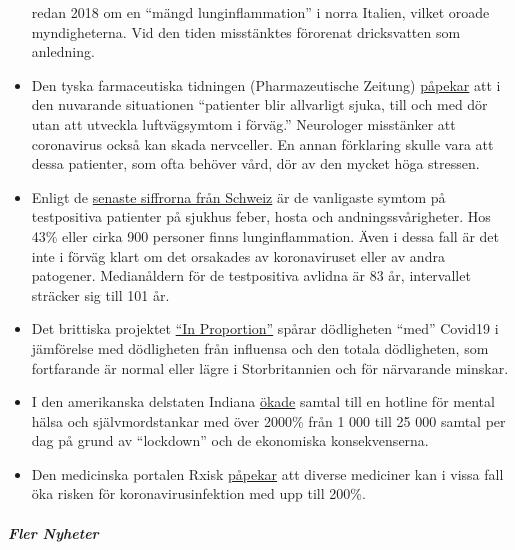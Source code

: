 \begin{itemize}
  redan 2018 om en ``mängd lunginflammation'' i norra Italien, vilket
  oroade myndigheterna. Vid den tiden misstänktes förorenat dricksvatten
  som anledning.
\item
  Den tyska farmaceutiska tidningen (Pharmazeutische Zeitung)
  \href{https://www.pharmazeutische-zeitung.de/atemstillstand-koennte-auch-zentrale-ursache-haben-116664/}{påpekar}
  att i den nuvarande situationen ``patienter blir allvarligt sjuka,
  till och med dör utan att utveckla luftvägsymtom i förväg.''
  Neurologer misstänker att coronavirus också kan skada nervceller. En
  annan förklaring skulle vara att dessa patienter, som ofta behöver
  vård, dör av den mycket höga stressen.
\item
  Enligt de
  \href{https://www.bag.admin.ch/dam/bag/de/dokumente/mt/k-und-i/aktuelle-ausbrueche-pandemien/2019-nCoV/covid-19-lagebericht.pdf.download.pdf/COVID-19_Epidemiologische_Lage_Schweiz.pdf}{senaste
  siffrorna från Schweiz} är de vanligaste symtom på testpositiva
  patienter på sjukhus feber, hosta och andningssvårigheter. Hos 43\%
  eller cirka 900 personer finns lunginflammation. Även i dessa fall är
  det inte i förväg klart om det orsakades av koronaviruset eller av
  andra patogener. Medianåldern för de testpositiva avlidna är 83 år,
  intervallet sträcker sig till 101 år.
\item
  Det brittiska projektet \href{http://inproportion2.talkigy.com/}{``In
  Proportion''} spårar dödligheten ``med'' Covid19 i jämförelse med
  dödligheten från influensa och den totala dödligheten, som fortfarande
  är normal eller lägre i Storbritannien och för närvarande minskar.
\item
  I den amerikanska delstaten Indiana
  \href{https://twitter.com/JesseKellyDC/status/1246449878219145216}{ökade}
  samtal till en hotline för mental hälsa och självmordstankar med över
  2000\% från 1 000 till 25 000 samtal per dag på grund av ``lockdown''
  och de ekonomiska konsekvenserna.
\item
  Den medicinska portalen Rxisk
  \href{https://rxisk.org/medications-compromising-covid-infections/}{påpekar}
  att diverse mediciner kan i vissa fall öka risken för
  koronavirusinfektion med upp till 200\%.
\end{itemize}

\hypertarget{fler-nyheter}{%
\subparagraph{\texorpdfstring{\textbf{Fler
Nyheter}}{Fler Nyheter}}\label{fler-nyheter}}

